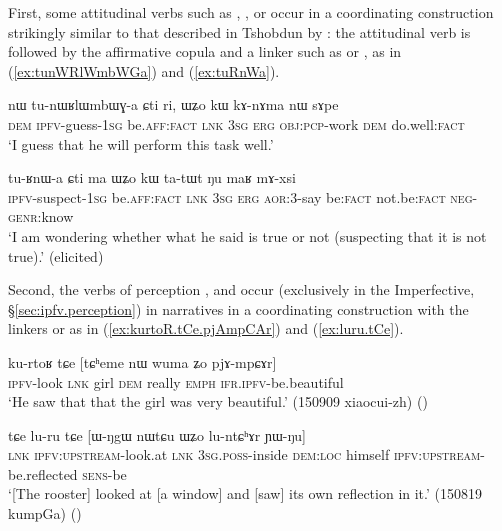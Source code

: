 First, some attitudinal verbs such as , ,  or  occur in a coordinating construction strikingly similar to that described in Tshobdun  by \citet[487--488]{sun12complementation}: the attitudinal verb is followed by the affirmative copula  and a linker such as  or , as in (\ref{ex:tunWRlWmbWGa}) and (\ref{ex:tuRnWa}).

\begin{exe}
	\ex \label{ex:tunWRlWmbWGa}
	\gll nɯ tu-nɯʁlɯmbɯɣ-a ɕti ri, ɯʑo kɯ kɤ-nɤma nɯ sɤpe \\
	\textsc{dem} \textsc{ipfv}-guess-\textsc{1sg} be.\textsc{aff}:\textsc{fact} \textsc{lnk} \textsc{3sg} \textsc{erg} \textsc{obj}:\textsc{pcp}-work \textsc{dem} do.well:\textsc{fact} \\
	\glt `I guess that he will perform this task well.'
\end{exe}

\begin{exe}
	\ex \label{ex:tuRnWa}
	\gll tu-ʁnɯ-a ɕti ma ɯʑo kɯ ta-tɯt ŋu maʁ mɤ-xsi \\
	\textsc{ipfv}-suspect-\textsc{1sg} be.\textsc{aff}:\textsc{fact} \textsc{lnk} \textsc{3sg} \textsc{erg} \textsc{aor}:3\flobv{}-say be:\textsc{fact} not.be:\textsc{fact} \textsc{neg}-\textsc{genr}:know \\
	\glt `I am wondering whether what he said is true or not (suspecting that it is not true).' (elicited)
\end{exe}

Second, the verbs of perception  ,   and  occur (exclusively in the Imperfective, §\ref{sec:ipfv.perception}) in narratives in a coordinating construction with the linkers  or  as in (\ref{ex:kurtoR.tCe.pjAmpCAr}) and (\ref{ex:luru.tCe}). 

\begin{exe}
	\ex \label{ex:kurtoR.tCe.pjAmpCAr}
	\gll  ku-rtoʁ tɕe [tɕʰeme nɯ wuma ʑo pjɤ-mpɕɤr] \\
	\textsc{ipfv}-look \textsc{lnk} girl \textsc{dem} really \textsc{emph} \textsc{ifr}.\textsc{ipfv}-be.beautiful \\
	\glt `He saw that that the girl was very beautiful.' (150909 xiaocui-zh)
()
\end{exe}

\begin{exe}
	\ex \label{ex:luru.tCe}
	\gll tɕe lu-ru tɕe [ɯ-ŋgɯ nɯtɕu ɯʑo lu-ntɕʰɤr ɲɯ-ŋu] \\
	\textsc{lnk} \textsc{ipfv}:\textsc{upstream}-look.at  \textsc{lnk}  \textsc{3sg}.\textsc{poss}-inside \textsc{dem}:\textsc{loc} himself \textsc{ipfv}:\textsc{upstream}-be.reflected \textsc{sens}-be \\
	\glt `[The rooster] looked at [a window] and [saw] its own reflection in it.' (150819 kumpGa)
()
\end{exe}

